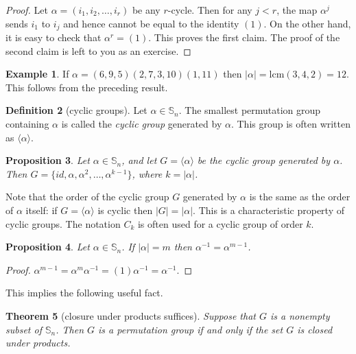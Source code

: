 \documentclass[11pt]{article}
\newtheorem{thm}{Theorem}[section]
\newtheorem{prop}[thm]{Proposition}
\theoremstyle{definition}
\newtheorem{defn}[thm]{Definition}
\newtheorem{example}[thm]{Example}
\newcommand{\gen}[1]{\langle #1 \rangle}
\newcommand{\Sym}{\mathbb{S}}
\begin{document}
\begin{proof}
Let $\alpha = (i_1, i_2, \dots, i_r)$ be any $r$-cycle. Then for any
$j < r$, the map $\alpha^j$ sends $i_1$ to $i_j$ and hence cannot be
equal to the identity $(1)$. On the other hand, it is easy to check
that $\alpha^r = (1)$. This proves the first claim.  The proof of the
second claim is left to you as an exercise.
\end{proof}

\begin{example}
  If $\alpha = (6,9,5)(2,7,3,10)(1,11)$ then $|\alpha| =
  \mathrm{lcm}(3,4,2) = 12$. This follows from the preceding result.
\end{example}


\begin{defn}[cyclic groups]
  Let $\alpha\in \Sym_n$. The smallest permutation group 
  containing $\alpha$ is called the \emph{cyclic group} generated by
  $\alpha$. This group is often written as $\gen{\alpha}$.
\end{defn}

\begin{prop}
  Let $\alpha\in \Sym_n$, and let $G = \gen{\alpha}$ be the cyclic
  group generated by $\alpha$. Then $G = \{id, \alpha, \alpha^2,
  \dots, \alpha^{k-1} \}$, where $k = |\alpha|$.
\end{prop}

Note that the order of the cyclic group $G$ generated by $\alpha$ is
the same as the order of $\alpha$ itself: if $G = \gen{\alpha}$ is
cyclic then $|G| = |\alpha|$. This is a characteristic property of
cyclic groups. The notation $C_k$ is often used for a cyclic group of
order $k$.


\begin{prop}\label{prop:inverse}
Let $\alpha \in \Sym_n$. If $|\alpha| = m$ then $\alpha^{-1} =
\alpha^{m-1}$.
\end{prop}

\begin{proof}
$\alpha^{m-1} = \alpha^m \alpha^{-1} = (1) \alpha^{-1} = \alpha^{-1}$. 
\end{proof}

This implies the following useful fact.

\begin{thm}[closure under products suffices]
  Suppose that $G$ is a nonempty subset of $\Sym_n$. Then $G$ is a
  permutation group if and only if the set $G$ is closed under
  products.
\end{thm}
\end{document}
